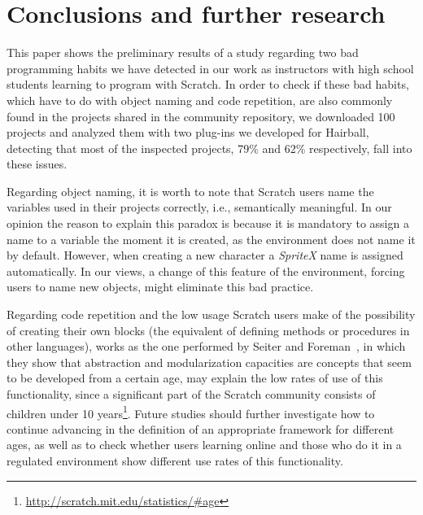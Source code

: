 \documentclass[conference]{format/IEEEtran}
\begin{document}
\section{Conclusions and further research}
\label{sec:conclusions}


This paper shows the preliminary results of a study regarding two bad programming habits we have detected in our work as instructors with high school students learning to program with Scratch. In order to check if these bad habits, which have to do with object naming and code repetition, are also commonly found in the projects shared in the community repository, we downloaded 100 projects and analyzed them with two plug-ins we developed for Hairball, detecting that most of the inspected projects, 79\% and 62\%  respectively, fall into these issues.

Regarding object naming, it is worth to note that Scratch users name the variables used in their projects correctly, i.e., semantically meaningful. In our opinion the reason to explain this paradox is because it is mandatory to assign a name to a variable the moment it is created, as the environment does not name it by default. However, when creating a new character a  \textit{SpriteX} name is assigned automatically. In our views, a change of this feature of the environment, forcing users to name new objects, might eliminate this bad practice.

Regarding code repetition and the low usage Scratch users make of the possibility of creating their own blocks (the equivalent of defining methods or procedures in other languages), works as the one performed by Seiter and Foreman~\cite {seiter2013modeling}, in which they show that abstraction and modularization capacities are concepts that seem to be developed from a certain age, may explain the low rates of use of this functionality, since a significant part of the Scratch community consists of children under 10 years\footnote{\url{http://scratch.mit.edu/statistics/#age}}. Future studies should further investigate how to continue advancing in the definition of an appropriate framework for different ages, as well as to check whether users learning online and those who do it in a regulated environment show different use rates of this functionality.

\end{document}
